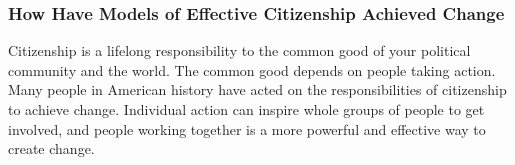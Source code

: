 \subsubsection*{How Have Models of Effective Citizenship Achieved Change}

Citizenship is a lifelong responsibility to the common good of your political
community and the world. The common good depends on people taking action. Many
people in American history have acted on the responsibilities of citizenship to
achieve change. Individual action can inspire whole groups of people to get
involved, and people working together is a more powerful and effective way to
create change.

\newpage

